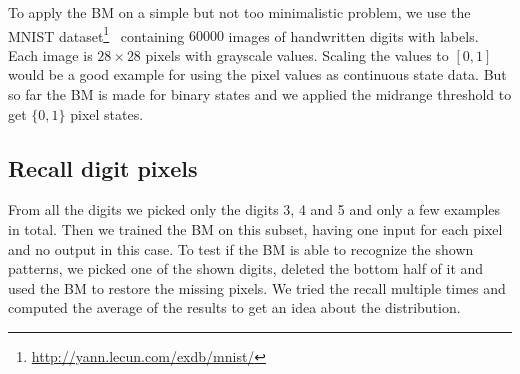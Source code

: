 \documentclass[12pt,twoside]{article}
\theoremstyle{plain}
\theoremstyle{definition}
\theoremstyle{remark}
\begin{document}
To apply the BM on a simple but not too minimalistic problem, we use the MNIST dataset\footnote{\url{http://yann.lecun.com/exdb/mnist/}}~\cite{MNIST} containing $60000$ images of handwritten digits with labels. Each image is $28 \times 28$ pixels with grayscale values. Scaling the values to $[0,1]$ would be a good example for using the pixel values as continuous state data. But so far the BM is made for binary states and we applied the midrange threshold to get $\{0, 1\}$ pixel states.


\subsection{Recall digit pixels}

From all the digits we picked only the digits 3, 4 and 5 and only a few examples in total. Then we trained the BM on this subset, having one input for each pixel and no output in this case. To test if the BM is able to recognize the shown patterns, we picked one of the shown digits, deleted the bottom half of it and used the BM to restore the missing pixels. We tried the recall multiple times and computed the average of the results to get an idea about the distribution.
\end{document}
